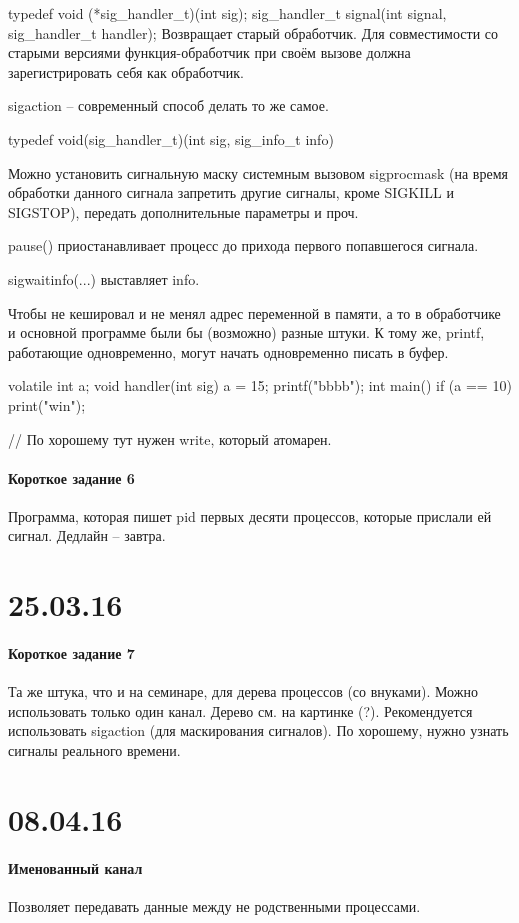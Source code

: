 \documentclass[a4paper,10pt]{article}
\begin{document}
typedef void (*sig\_handler\_t)(int sig);
sig\_handler\_t signal(int signal, sig\_handler\_t handler);
Возвращает старый обработчик.
Для совместимости со старыми версиями функция-обработчик при своём вызове должна зарегистрировать себя как обработчик.

sigaction -- современный способ делать то же самое.

typedef void(sig\_handler\_t)(int sig, sig\_info\_t info)

Можно установить сигнальную маску системным вызовом sigprocmask (на время обработки данного сигнала запретить другие сигналы, кроме SIGKILL и SIGSTOP), передать дополнительные параметры и проч.

pause() приостанавливает процесс до прихода первого попавшегося сигнала.

sigwaitinfo(...) выставляет info.

Чтобы не кешировал и не менял адрес переменной в памяти, а то в обработчике и основной программе были бы (возможно) разные штуки. К тому же, printf, работающие одновременно, могут начать одновременно писать в буфер.

volatile int a; 
void handler(int sig)
{
a = 15; printf("bbbb"); 
}
int main() {
if (a == 10) {
print("win");
}
}

// По хорошему тут нужен write, который атомарен.
\paragraph{Короткое задание 6}
Программа, которая пишет pid первых десяти процессов, которые прислали ей сигнал. Дедлайн -- завтра.

\section{25.03.16}
\paragraph{Короткое задание 7}
Та же штука, что и на семинаре, для дерева процессов (со внуками). Можно использовать только один канал. Дерево см. на картинке (?).
Рекомендуется использовать sigaction (для маскирования сигналов). По хорошему, нужно узнать сигналы реального времени.

\section{08.04.16}
\paragraph{Именованный канал}
Позволяет передавать данные между не родственными процессами.
\end{document}
